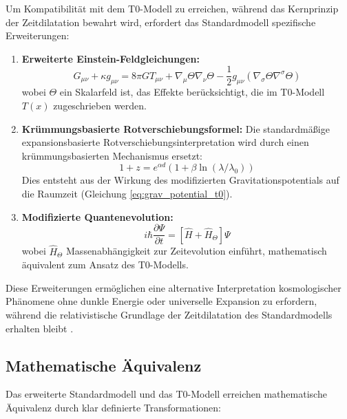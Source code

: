 \documentclass[12pt,a4paper]{article}
\newcommand{\Tfield}{T(x)}
\begin{document}
	Um Kompatibilität mit dem T0-Modell zu erreichen, während das Kernprinzip der Zeitdilatation bewahrt wird, erfordert das Standardmodell spezifische Erweiterungen:
	
	\begin{enumerate}
		\item \textbf{Erweiterte Einstein-Feldgleichungen:}
		\begin{equation}
			G_{\mu\nu} + \kappa g_{\mu\nu} = 8\pi G T_{\mu\nu} + \nabla_{\mu}\Theta\nabla_{\nu}\Theta - \frac{1}{2}g_{\mu\nu}(\nabla_{\sigma}\Theta\nabla^{\sigma}\Theta)
			\label{eq:extended_einstein}
		\end{equation}
		wobei \(\Theta\) ein Skalarfeld ist, das Effekte berücksichtigt, die im T0-Modell \(\Tfield\) zugeschrieben werden.
		
		\item \textbf{Krümmungsbasierte Rotverschiebungsformel:} Die standardmäßige expansionsbasierte Rotverschiebungsinterpretation wird durch einen krümmungsbasierten Mechanismus ersetzt:
		\begin{equation}
			1 + z = e^{\alpha d}(1 + \beta \ln(\lambda/\lambda_0))
			\label{eq:extended_redshift}
		\end{equation}
		Dies entsteht aus der Wirkung des modifizierten Gravitationspotentials auf die Raumzeit (Gleichung \ref{eq:grav_potential_t0}).
		
		\item \textbf{Modifizierte Quantenevolution:}
		\begin{equation}
			i\hbar\frac{\partial\Psi}{\partial t} = [\hat{H} + \hat{H}_{\Theta}]\Psi
			\label{eq:extended_schrodinger}
		\end{equation}
		wobei \(\hat{H}_{\Theta}\) Massenabhängigkeit zur Zeitevolution einführt, mathematisch äquivalent zum Ansatz des T0-Modells.
	\end{enumerate}
	
	Diese Erweiterungen ermöglichen eine alternative Interpretation kosmologischer Phänomene ohne dunkle Energie oder universelle Expansion zu erfordern, während die relativistische Grundlage der Zeitdilatation des Standardmodells erhalten bleibt \cite{pascher_standardmod_2025}.
	
	\subsection{Mathematische Äquivalenz}
	\label{subsec:mathematical_equivalence}
	
	Das erweiterte Standardmodell und das T0-Modell erreichen mathematische Äquivalenz durch klar definierte Transformationen:
	
\end{document}
